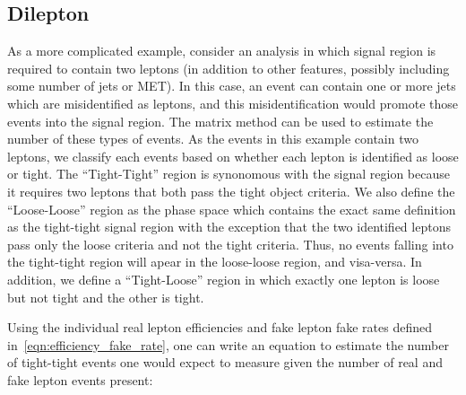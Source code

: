 \subsection{Dilepton}

As a more complicated example, consider an analysis in which signal region is required to contain two leptons
(in addition to other features, possibly including some number of jets or MET).
In this case, an event can contain one or more jets which are misidentified as leptons, and this misidentification would promote those events into the signal region.
The matrix method can be used to estimate the number of these types of events.
As the events in this example contain two leptons, we classify each events based on whether each lepton
is identified as loose or tight.
The ``Tight-Tight'' region is synonomous with the signal region because it requires two leptons that both pass the tight object criteria.
We also define the ``Loose-Loose'' region as the phase space which contains the exact same definition as the tight-tight signal region with the exception that the two identified leptons pass only the loose criteria and not the tight criteria.
Thus, no events falling into the tight-tight region will apear in the loose-loose region, and visa-versa.
In addition, we define a ``Tight-Loose'' region in which exactly one lepton is loose but not tight and the other is tight.

Using the individual real lepton efficiencies and fake lepton fake rates defined in~\ref{eqn:efficiency_fake_rate},
one can write an equation to estimate the number of tight-tight events one would expect to measure given
the number of real and fake lepton events present:


